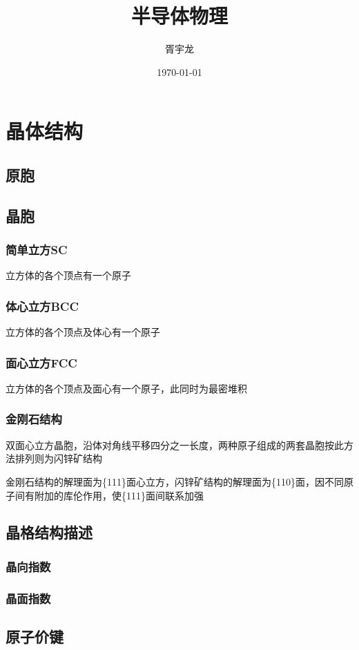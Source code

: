 \documentclass[12pt]{ctexart}
\title{半导体物理}
\author{胥宇龙}
\date{\today}
\begin{document}
    
\maketitle

\tableofcontents
\newpage

\section{晶体结构}
\subsection{原胞}
\subsection{晶胞}
\subsubsection{简单立方SC}
立方体的各个顶点有一个原子
\subsubsection{体心立方BCC}
立方体的各个顶点及体心有一个原子
\subsubsection{面心立方FCC}
立方体的各个顶点及面心有一个原子，此同时为最密堆积
\subsubsection{金刚石结构}
双面心立方晶胞，沿体对角线平移四分之一长度，两种原子组成的两套晶胞按此方法排列则为闪锌矿结构

金刚石结构的解理面为\{111\}面心立方，闪锌矿结构的解理面为\{110\}面，因不同原子间有附加的库伦作用，使\{111\}面间联系加强
\subsection{晶格结构描述}
\subsubsection{晶向指数}
\subsubsection{晶面指数}

\subsection{原子价键}
\end{document}
